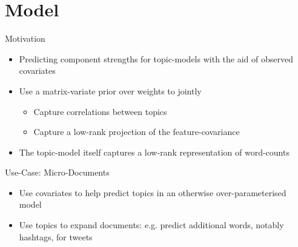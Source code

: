 \documentclass[xcolor=dvipsnames]{beamer}
\newcommand \vecf[1] {
    \text{vec}\left(#1\right)
}
\newcommand \halve[1] {
	\frac{#1}{2}
}
\newcommand \half {
    \halve{1}
}
\newcommand \tr { \text{tr} }
\newcommand \T { ^\top }
\newcommand \nor[2]   { \mathcal{N} \left( {#1}, {#2} \right) }
\newcommand \mnor[3]  { \mathcal{N} \left(#1, #2, #3\right) }
\newcommand \Tr[1]   { \tr \left(  {#1}  \right) }
\newcommand \MReal[2] { { \mathbb{R}^{#1 \times #2} } }
\newcommand \inv[1] { {#1}^{-1} }
\begin{document}
%
%
%
%
%
%





\section{Model}
\begin{frame}{Motivation}

\begin{itemize}
    \item Predicting component strengths for topic-models with the aid of observed covariates
    \item Use a matrix-variate prior over weights to jointly
    \begin{itemize}
        \item Capture correlations between topics
        \item Capture a low-rank projection of the feature-covariance      
    \end{itemize}
    \item The topic-model itself captures a low-rank representation of word-counts  
\end{itemize}

\pause
Use-Case: Micro-Documents
\begin{itemize}
    \item Use covariates to help predict topics in an otherwise over-parameterised model
    \item Use topics to expand documents: e.g. predict additional words, notably hashtags, for tweets 
\end{itemize}

\end{frame}
\end{document}
